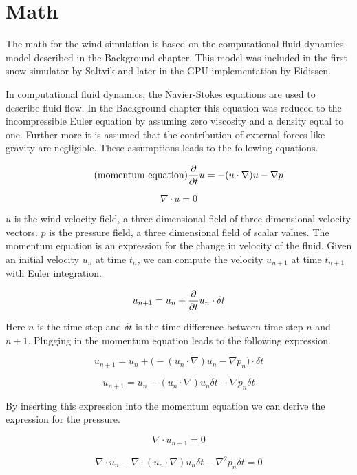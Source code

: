 \section{Math}

The math for the wind simulation is based on the computational fluid dynamics
model described in the Background chapter. This model was included in the first 
snow simulator by Saltvik\cite{originalSnowThesis} and later in the GPU 
implementation by Eidissen\cite{gpuSnowThesis}.

In computational fluid dynamics, the Navier-Stokes equations are used to describe 
fluid flow. In the Background chapter this equation was reduced to the 
incompressible Euler equation by assuming zero viscosity and a density equal to 
one. Further more it is assumed that the contribution of external forces like 
gravity are negligible. These assumptions leads to the following equations. 

\begin{equation} 
	\tag{momentum equation}
	\frac{\partial}{\partial t}u  = -(u \cdot \nabla)u - \nabla p
\end{equation}

\begin{equation}
	\tag{continuity equation}
	\nabla \cdot u = 0
\end{equation}

$u$ is the wind velocity field, a three dimensional field of three dimensional 
velocity vectors. $p$ is the pressure field, a three dimensional field of scalar 
values. The momentum equation is an expression for the change in velocity of the
fluid. Given an initial velocity $u_n$ at time $t_n$, we can compute the velocity 
$u_{n+1}$ at time $t_{n+1}$ with Euler integration.

$$ u_{n+1} = u_n + \frac{\partial}{\partial t}u_n \cdot \delta t $$

Here $n$ is the time step and $\delta t$ is the time difference between time step 
$n$ and $n+1$. Plugging in the momentum equation leads to the following expression.

$$ u_{n+1} = u_n + \big( -(u_n \cdot \nabla)u_n - \nabla p_n \big) \cdot \delta t $$

$$ u_{n+1} = u_n - (u_n \cdot \nabla)u_n \delta t - \nabla p_n \delta t $$

By inserting this expression into the momentum equation we can derive the
expression for the pressure. 

$$ \nabla \cdot u_{n+1} = 0 $$

$$ \nabla \cdot u_n - \nabla \cdot (u_n \cdot \nabla)u_n \delta t - \nabla^2 p_n \delta t = 0 $$

